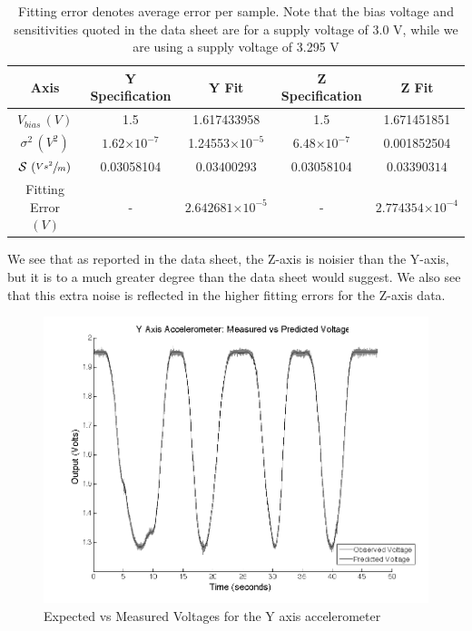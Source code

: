 \documentclass{article}
\theoremstyle{plain}
\theoremstyle{definition}
\theoremstyle{remark}
\newcommand{\Sens}{\mathcal{S}}
\providecommand{\e}[1]{\ensuremath{\times 10^{#1}}}
\begin{document}
\begin{table}
\begin{center}
    \begin{tabular}{|c|c|c|c|c|}
        \hline
        Axis                              & Y Specification & Y   Fit & Z Specification                & Z    Fit                \\ \hline
        $V_{bias} \, (V)$                & 1.5        & 1.617433958  & 1.5         & 1.671451851           \\ 
        $\sigma^2 \, (V^2)$                  & $1.62 \e{-7}$      & 1.24553\e{-5}    & $6.48 \e{-7}$       & 0.001852504           \\ 
        $\Sens \, \left(\sfrac{V s^2}{m} \right)$                & 0.03058104           & $0.03400293$  & 0.03058104   & $0.03390314$     \\ 
        Fitting Error $(V)$  & - & $2.642681\e{-5}$  & - & $2.774354\e{-4}$ \\
        \hline
    \end{tabular}
\caption{Fitting error denotes average error per sample.  Note that the bias voltage and sensitivities quoted in the data sheet are for a supply voltage of 3.0 V, while we are using a supply voltage of 3.295 V}
\label{ParamID_T}
\end{center}
\end{table}

We see that as reported in the data sheet, the Z-axis is noisier than the Y-axis, but it is to a much greater degree than the data sheet would suggest.  We also see that this extra noise is reflected in the higher fitting errors for the Z-axis data.  

\begin{figure}
\begin{center}
\includegraphics[width = 13cm]{YaxisAccel_Calib.png}
\caption{Expected vs Measured Voltages for the Y axis accelerometer}
\label{YaccelCalib}
\end{center}
\end{figure}
\end{document}
